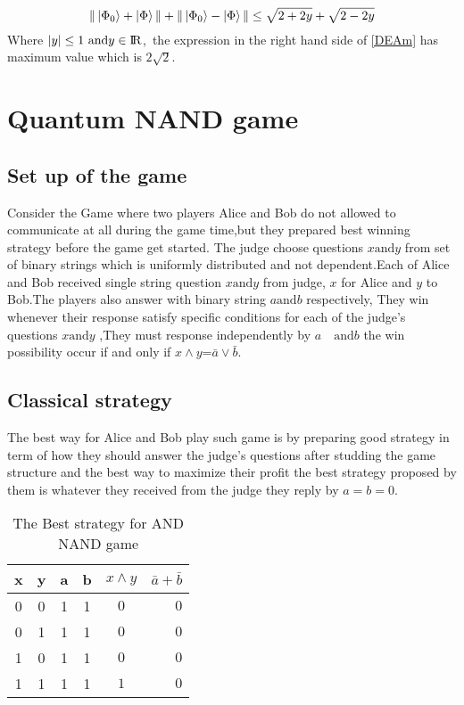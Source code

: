 \begin{equation}\label{DEAm}
\| \ket{\Phi_0}+ \ket{\Phi}\| +\| \ket{\Phi_0}- \ket{\Phi}\| \leq \sqrt{2+2y}+\sqrt{2-2y}
\end{equation} 
Where $|y|\leq 1 \text{ and} y\in {\rm I\!R}$,~the expression in the right hand side of \ref{DEAm} has maximum value which is $2\sqrt{2}$.

\section{Quantum NAND game}

\subsection{Set up of the game} 
Consider the Game where two players Alice and Bob  do not allowed to  communicate
at all during the game time,but they prepared  best winning strategy  before the game get started\citep{ANDJIGA1988189}. The judge choose  questions $x  \text{and} y$  from set of binary strings which is uniformly  distributed and not dependent.Each of Alice and Bob received single string question $x \text{and} y$ from  judge, $x$ for Alice and $y$ to Bob.The players also answer with binary string  $a \text{and}  b$ respectively, They win whenever their response satisfy specific conditions for each of the judge's questions $x \text{and}  y$ ,They must response independently by  $a \quad \text{and}  b$ the win possibility occur  if and only if $x \wedge y$=$\bar{a}\vee\bar{b}$.
\subsection{Classical strategy} 
The best way for Alice and Bob play such game is by preparing good strategy in term of how they should answer the judge's questions after studding the game structure and the best way to maximize their profit the best  strategy proposed by them is whatever they received  from the  judge they reply by $a=b=0$.

\begin {table}[htp]
\begin{center}
\begin{tabular}{ |c|c|c|c|c r| }
  \hline
  x & y & a & b &  $x \wedge y $ & $\bar{a}+\bar{b}$\\
  \hline 
  0 & 0 & 1 & 1 &$0$  & $0$\\
  \hline
  0 &1 & 1 & 1 &$0$  & $0$\\
  \hline
   1 & 0 & 1 & 1 &$0$ &  $0$\\
  \hline
  1 & 1 & 1 & 1 &$1$  & $0$\\
  \hline
\end{tabular}
\caption {The Best strategy for AND NAND game}
\end{center}
\end{table}

